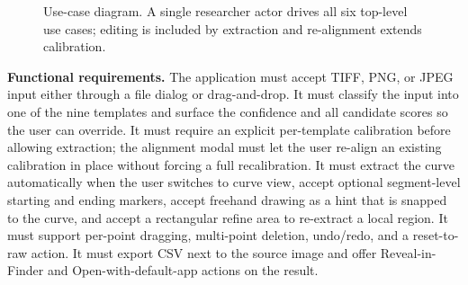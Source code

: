 \documentclass[a4paper,12pt]{report}
\begin{document}
\begin{figure}[h!]
\centering
{}
\caption{Use-case diagram. A single researcher actor drives all six top-level use cases; editing is included by extraction and re-alignment extends calibration.}
\label{fig:usecase}
\end{figure}

\textbf{Functional requirements.} The application must accept TIFF, PNG, or JPEG input either through a file dialog or drag-and-drop. It must classify the input into one of the nine templates and surface the confidence and all candidate scores so the user can override. It must require an explicit per-template calibration before allowing extraction; the alignment modal must let the user re-align an existing calibration in place without forcing a full recalibration. It must extract the curve automatically when the user switches to curve view, accept optional segment-level starting and ending markers, accept freehand drawing as a hint that is snapped to the curve, and accept a rectangular refine area to re-extract a local region. It must support per-point dragging, multi-point deletion, undo/redo, and a reset-to-raw action. It must export CSV next to the source image and offer Reveal-in-Finder and Open-with-default-app actions on the result.
\end{document}

